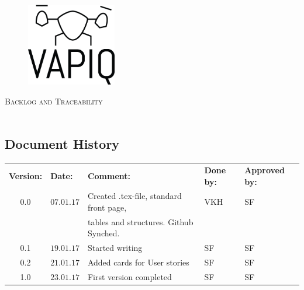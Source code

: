 \documentclass{article}
\author{Aleksander Holthe  \\ Katrine Sundal Haune \\ Kent Kjeldaas \\ Stian Fredriksen \\ Tomas Lyngroth \\ Vanja Katinka Halvorsen}
\makeatletter
\let\vapiqteam\@author
\makeatother
\begin{document}
\begin{titlepage}
    \centering
    \pagecolor{gainsboro}
	\\[3.0 cm]
    \begin{figure}[h]
        \centering
        \includegraphics[width = 0.35\textwidth]{VAPIQ-PICTURES//Logo2_Tilted.png}
        \\[2.0 cm] 
    \end{figure}                              
    \textsc{\Huge Backlog and Traceability}  
    \\[1 cm]
    \textsc{\Large }   
    \\[3.0 cm]
	\large \vapiqteam      
\end{titlepage}
\pagecolor{white}


\begin{center}
\section*{\textbf{Document History}}
\begin{tabular}{cllll}
\rowcolor{cadetgrey}
\textbf{Version:}    &\textbf{Date:} 	 &\textbf{Comment:}    &\textbf{Done by:}   &\textbf{Approved by:}  \\

0.0       & $07.01.17$   & Created .tex-file, standard front page,  & VKH  & SF \\
          &              & tables and structures. Github Synched.   &      & \\\rowcolor{gainsboro}
0.1       & $19.01.17$   & Started writing   & SF    & SF          \\
0.2       & $21.01.17$   & Added cards for User stories  & SF    &  SF          \\ \rowcolor{gainsboro}
1.0       & $23.01.17$   & First version completed  & SF    &  SF          \\
\end{tabular}                                                                   
\end{center}
\end{document}
